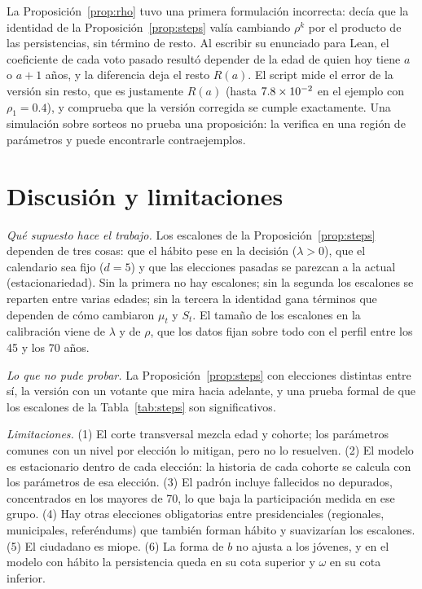 \documentclass[11pt]{article}
\theoremstyle{definition}
\newcommand{\1}{\mathbbm{1}}
\begin{document}
La Proposición~\ref{prop:rho} tuvo una primera formulación incorrecta: decía que la identidad de la
Proposición~\ref{prop:steps} valía cambiando $\rho^{k}$ por el producto de las persistencias, sin
término de resto. Al escribir su enunciado para Lean, el coeficiente de cada voto pasado resultó
depender de la edad de quien hoy tiene $a$ o $a+1$ años, y la diferencia deja el resto $R(a)$. El
script mide el error de la versión sin resto, que es justamente $R(a)$ (hasta $7.8\times10^{-2}$ en el
ejemplo con $\rho_1=0.4$), y comprueba que la versión corregida se cumple exactamente. Una simulación
sobre sorteos no prueba una proposición: la verifica en una región de parámetros y puede encontrarle
contraejemplos.

\section{Discusión y limitaciones}\label{sec:disc}

\emph{Qué supuesto hace el trabajo.} Los escalones de la Proposición~\ref{prop:steps} dependen de
tres cosas: que el hábito pese en la decisión ($\lambda>0$), que el calendario sea fijo ($d=5$) y que
las elecciones pasadas se parezcan a la actual (estacionariedad). Sin la primera no hay escalones;
sin la segunda los escalones se reparten entre varias edades; sin la tercera la identidad gana
términos que dependen de cómo cambiaron $\mu_t$ y $S_t$. El tamaño de los escalones en la calibración
viene de $\lambda$ y de $\rho$, que los datos fijan sobre todo con el perfil entre los 45 y los 70
años.

\emph{Lo que no pude probar.} La Proposición~\ref{prop:steps} con elecciones distintas entre sí, la
versión con un votante que mira hacia adelante, y una prueba formal de que los escalones de la
Tabla~\ref{tab:steps} son significativos.

\emph{Limitaciones.} (1) El corte transversal mezcla edad y cohorte; los parámetros comunes con un
nivel por elección lo mitigan, pero no lo resuelven. (2) El modelo es estacionario dentro de cada
elección: la historia de cada cohorte se calcula con los parámetros de esa elección. (3) El padrón
incluye fallecidos no depurados, concentrados en los mayores de 70, lo que baja la participación
medida en ese grupo. (4) Hay otras elecciones obligatorias entre presidenciales (regionales,
municipales, referéndums) que también forman hábito y suavizarían los escalones. (5) El ciudadano es
miope. (6) La forma de $b$ no ajusta a los jóvenes, y en el modelo con hábito la persistencia queda
en su cota superior y $\omega$ en su cota inferior.
\end{document}
